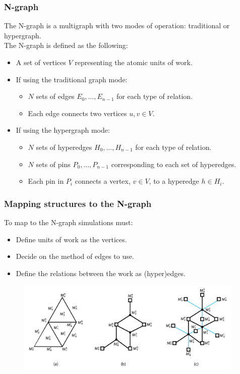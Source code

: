 \documentclass{beamer}
\begin{document}
\begin{frame}
  \frametitle{N-graph}
  The N-graph is a multigraph with two modes of operation: traditional or hypergraph.\\
  \smallskip
  The N-graph is defined as the following:
  \begin{itemize}
  \item A set of vertices $V$ representing the atomic units of work.
  \item If using the traditional graph mode:
    \begin{itemize}
    \item $N$ sets of edges $E_0,...,E_{n-1}$ for each type of relation.
    \item Each edge connects two vertices $u,v \in V$.
    \end{itemize}
  \item If using the hypergraph mode:
    \begin{itemize}
    \item $N$ sets of hyperedges $H_0,...,H_{n-1}$ for each type of relation.
    \item $N$ sets of pins $P_0,...,P_{n-1}$ corresponding to each set of hyperedges.
    \item Each pin in $P_i$ connects a vertex, $v \in V$, to a hyperedge $h \in H_i$.
    \end{itemize}
  \end{itemize}
\end{frame}

\begin{frame}
  \frametitle{Mapping structures to the N-graph}
  To map to the N-graph simulations must:
  \begin{itemize}
  \item Define units of work as the vertices.
  \item Decide on the method of edges to use.
  \item Define the relations between the work as (hyper)edges.
  \end{itemize}
  \begin{figure}
    \centering
    \includegraphics[width=.9\textwidth,height = 1.75in]{figures/exampleMesh2Graph.png}
  \end{figure}
\end{frame}
\end{document}

